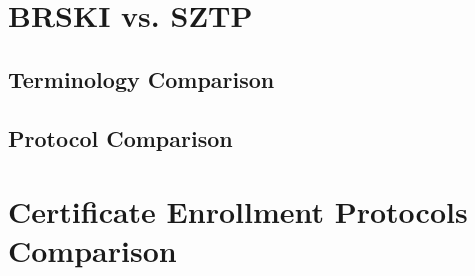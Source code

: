 \chapter{BRSKI vs. SZTP}\label{appendix-A}
\section{Terminology Comparison}

\begin{landscape}
\section{Protocol Comparison}

\end{landscape}
\chapter{Certificate Enrollment Protocols Comparison}\label{appendix-enrollment}
